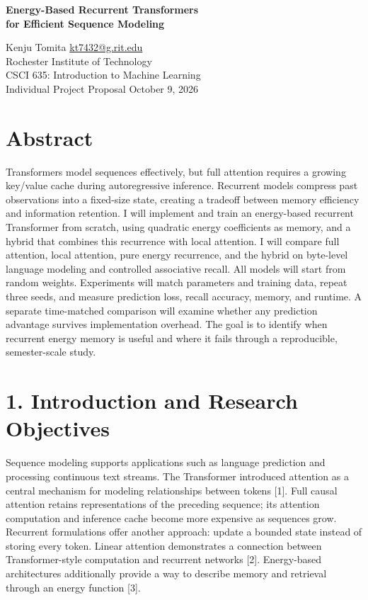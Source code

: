 \documentclass[11pt,letterpaper]{article}
\begin{document}
\begin{center}
{\Large\bfseries Energy-Based Recurrent Transformers\\for Efficient Sequence Modeling}\par
\vspace{3pt}
Kenju Tomita \quad \href{mailto:kt7432@g.rit.edu}{kt7432@g.rit.edu}\\
Rochester Institute of Technology\\
CSCI 635: Introduction to Machine Learning\\
Individual Project Proposal \quad October 9, 2026
\end{center}

\section*{Abstract}

Transformers model sequences effectively, but full attention requires a growing key/value cache during autoregressive inference. Recurrent models compress past observations into a fixed-size state, creating a tradeoff between memory efficiency and information retention. I will implement and train an energy-based recurrent Transformer from scratch, using quadratic energy coefficients as memory, and a hybrid that combines this recurrence with local attention. I will compare full attention, local attention, pure energy recurrence, and the hybrid on byte-level language modeling and controlled associative recall. All models will start from random weights. Experiments will match parameters and training data, repeat three seeds, and measure prediction loss, recall accuracy, memory, and runtime. A separate time-matched comparison will examine whether any prediction advantage survives implementation overhead. The goal is to identify when recurrent energy memory is useful and where it fails through a reproducible, semester-scale study.

\section*{1. Introduction and Research Objectives}

Sequence modeling supports applications such as language prediction and processing continuous text streams. The Transformer introduced attention as a central mechanism for modeling relationships between tokens [1]. Full causal attention retains representations of the preceding sequence; its attention computation and inference cache become more expensive as sequences grow. Recurrent formulations offer another approach: update a bounded state instead of storing every token. Linear attention demonstrates a connection between Transformer-style computation and recurrent networks [2]. Energy-based architectures additionally provide a way to describe memory and retrieval through an energy function [3].
\end{document}
